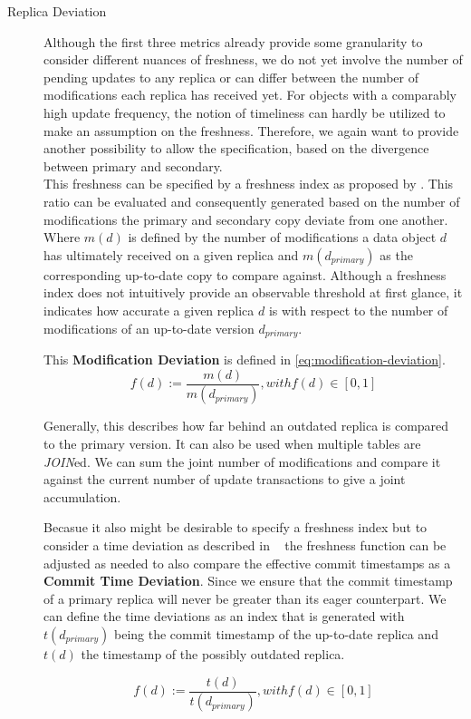 \begin{description}
    \item [Replica Deviation] Although the first three metrics already provide some granularity to consider different nuances of freshness, we 
        do not yet involve the number of pending updates to any replica or can differ between the number of modifications each replica has received yet.
        For objects with a comparably high update frequency, the notion of timeliness can hardly be utilized to make an assumption on the freshness.
        Therefore, we again want to provide another possibility to allow the specification, based on the divergence between primary and secondary.\\
        This freshness can be specified by a freshness index as proposed by \cite{rohm:2002}.
        This ratio can be evaluated and consequently generated based on the number of modifications the primary and 
        secondary copy deviate from one another. Where $m(d)$ is defined by the number of modifications a data object $d$ has ultimately received on a given replica
        and $m(d_{primary})$ as the corresponding up-to-date copy to compare against. 
        Although a freshness index does not intuitively provide an observable threshold at first glance, it indicates how accurate a 
        given replica $d$ is with respect to the number of modifications of an up-to-date version $d_{primary}$.

        This \textbf{Modification Deviation} is defined in \ref{eq:modification-deviation}.
        \begin{equation} \label{eq:modification-deviation}
            f(d) := \frac{m(d)}{m(d_{primary})},  with f(d) \in [0,1]
        \end{equation}
        
        Generally, this describes how far behind an outdated replica is compared to the primary version.
        It can also be used when multiple tables are \emph{JOIN}ed.
        We can sum the joint number of modifications and compare it against the current number of update transactions to give a joint accumulation.

        Becasue it also might be desirable to specify a freshness index but to consider a time deviation as described in ~\cite{voicu:2010,hennemann_sw_2021}
        the freshness function can be adjusted as needed to also compare the effective commit timestamps as a \textbf{Commit Time Deviation}.
        Since we ensure that the commit timestamp of a primary replica will never be greater than its eager counterpart. We can define the time deviations as an index that is 
        generated with $t(d_{primary})$ being the commit timestamp of the up-to-date replica and $t(d)$ the timestamp of the possibly outdated replica.


        \begin{equation}
            f(d) := \frac{t(d)}{t(d_{primary})},  with f(d) \in [0,1]
        \end{equation}

\end{description}

